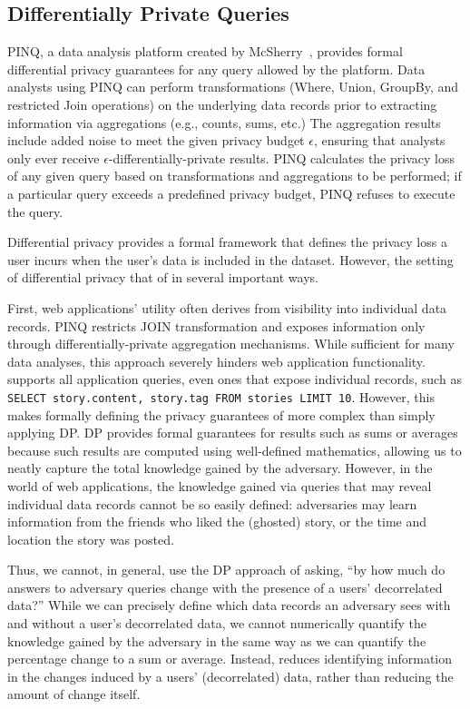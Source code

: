 \subsection{Differentially Private Queries}

PINQ, a data analysis platform created by McSherry~\cite{pinq}, provides formal differential privacy
guarantees for any query allowed by the platform.  Data analysts using PINQ can perform
transformations (Where, Union, GroupBy, and restricted Join operations) on the underlying data
records prior to extracting information via aggregations (e.g., counts, sums, etc.) The aggregation
results include added noise to meet the given privacy budget $\epsilon$, ensuring that analysts only
ever receive $\epsilon$-differentially-private results.  PINQ calculates the privacy loss of any
given query based on transformations and aggregations to be performed; if a particular query exceeds
a predefined privacy budget, PINQ refuses to execute the query.

Differential privacy provides a formal framework that defines the privacy loss a user incurs
when the user's data is included in the dataset. However, the setting of differential privacy
that of \name in several important ways.

First, web applications' utility often derives from visibility into individual data records. PINQ
restricts JOIN transformation and exposes information only through differentially-private
aggregation mechanisms. While sufficient for many data analyses, this approach severely hinders web
application functionality. \name supports all application queries, even ones that expose individual
records, such as \texttt{SELECT story.content, story.tag FROM stories LIMIT 10}.
However, this makes formally defining the privacy guarantees of \name more complex than
simply applying DP.  DP provides formal guarantees for results such as sums or averages because such
results are computed using well-defined mathematics, allowing us to neatly capture the total
knowledge gained by the adversary. However, in the world of web applications, the knowledge gained
via queries that may reveal individual data records cannot be so easily defined: adversaries may
learn information from the friends who liked the (ghosted) story, or the time and location the story
was posted.

Thus, we cannot, in general, use the DP approach of asking, ``by how much do answers to adversary
queries change with the presence of a users' decorrelated data?'' While we can precisely define which
data records an adversary sees with and without a user's decorrelated data, we cannot numerically
quantify the knowledge gained by the adversary in the same way as we can quantify the percentage
change to a sum or average.
Instead, \name reduces identifying information in the changes induced by a users' (decorrelated)
data, rather than reducing the amount of change itself.

